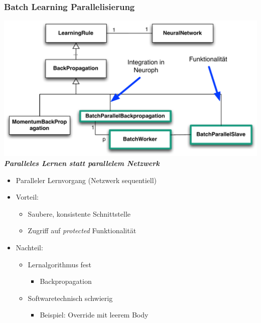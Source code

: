 \documentclass[18pt]{beamer}
\begin{document}
	\begin{frame}[c,allowframebreaks]\frametitle{Batch Learning Parallelisierung}

		\includegraphics[scale=0.58]{Grafiken/Batchparallel_uml.pdf}
		\\
		\textbf{\textit{Paralleles Lernen statt parallelem Netzwerk}}
	\framebreak

		\begin{itemize}
			\item Paralleler Lernvorgang (Netzwerk sequentiell)
			\item Vorteil:
			\begin{itemize}
				\item Saubere, konsistente Schnittstelle
				\item Zugriff auf \textit{protected} Funktionalität
			\end{itemize}
			\item Nachteil: 
			\begin{itemize}
				\item Lernalgorithmus fest 
				\begin{itemize}
					\item Backpropagation
				\end{itemize}
				\item Softwaretechnisch schwierig
				\begin{itemize}
					\item Beispiel: Override mit leerem Body
				\end{itemize}
			\end{itemize}
		\end{itemize}


\end{frame}
\end{document}
